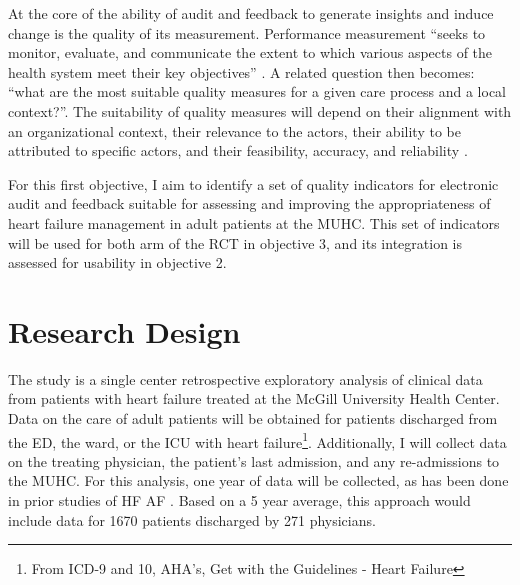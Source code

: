 

At the core of the ability of audit and feedback to generate insights and induce change is the quality of its measurement. Performance measurement ``seeks to monitor, evaluate, and communicate the extent to which various aspects of the health system meet their key objectives'' \cite{smith2009performance}. A related question then becomes: ``what are the most suitable quality measures for a given care process and a local context?''. The suitability of quality measures will depend on their alignment with an organizational context, their relevance to the actors, their ability to be attributed to specific actors, and their feasibility, accuracy, and reliability \cite{polanczyk2019quality}.

For this first objective, I aim to identify a set of quality indicators for electronic audit and feedback suitable for assessing and improving the appropriateness of heart failure management in adult patients at the MUHC. This set of indicators will be used for both arm of the RCT in objective 3, and its integration is assessed for usability in objective 2.

\section{Research Design}
The study is a single center retrospective exploratory analysis of clinical data from patients with heart failure treated at the McGill University Health Center. Data on the care of adult patients will be obtained for patients discharged from the ED, the ward, or the ICU with heart failure\footnote{From ICD-9 and 10, AHA's, Get with the Guidelines\textsuperscript{\textcopyright} - Heart Failure}. Additionally, I will collect data on the treating physician, the patient's last admission, and any re-admissions to the \gls{MUHC}. For this analysis, one year of data will be collected, as has been done in prior studies of \gls{HF} \gls{AF} \cite{kasje2006educational}. Based on a 5 year average, this approach would include data for 1670 patients discharged by 271 physicians.

